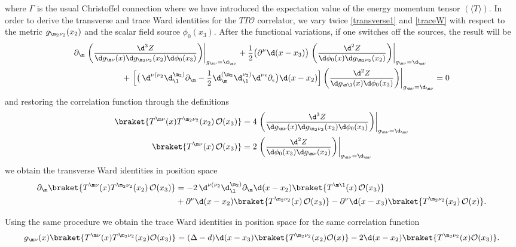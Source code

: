 \documentclass[a4paper,11pt,openright,twoside]{book}
\newcommand{\mO}{\mathcal{O}}
\let\e=\epsilon \let\z=\zeta   \let\h=\eta     \let\q=\theta
\let\n=\nu      \let\x=\xi     \let\p=\pi      \let\r=\rho
\let\G=\Gamma  \let\D=\Delta \let\Q=\Theta  \let\L=\Lambda
\newcommand{\sdfrac}[2]{\mbox{\small$\displaystyle\frac{#1}{#2}$}}
\numberwithin{equation}{section}
\begin{document}
{{where $\G$ is the usual Christoffel connection where we have introduced the  expectation value of the energy momentum tensor $(\langle T \rangle)$. In order to derive the transverse and trace Ward identities for the $TT\mO$ correlator, we vary twice \eqref{transverse1} and \eqref{traceW} with respect to the metric $g_{\m_2\n_2}(x_2)$ and the scalar field source $\phi_0(x_3)$. After the functional variations, if one switches off the sources, the result will be 
\begin{align}
	&\partial_\m\left.\left(\sdfrac{\d^3 Z}{\d g_{\m\n}(x)\d g_{\m_2\n_2}(x_2)\d\phi_0(x_3)}\right)\right|_{g_{\m\n}=\d_{\m\n}}+\sdfrac{1}{2}\big(\partial^\n\d(x-x_3)\big)\left.\left(\sdfrac{\d^2 Z}{\d \phi_0(x)\d g_{\m_2\n_2}(x_2)}\right)\right|_{g_{\m\n}=\d_{\m\n}}\notag\\
	&\hspace{2cm}+\left.\left[\big(\,\d^{\n(\n_2}\d^{\m_2)}_\l\partial_\m-\sdfrac{1}{2}\d_\m^{(\m_2}\d^{\n_2)}_\l\d^{\n\e}\partial_\e\big)\d(x-x_2)\right]\left(\sdfrac{\d^2 Z}{\d g_{\m\l}(x)\d\phi_0(x_3)}\right)\right|_{g_{\m\n}=\d_{\m\n}}=0
\end{align}
and restoring the correlation function through the definitions
\begin{align}
	\braket{T^{\m\n}(x)T^{\m_2\n_2}(x_2)\,\mO(x_3)}&=4\left.\left(\sdfrac{\d^3 Z}{\d g_{\m\n}(x)\d g_{\m_2\n_2}(x_2)\d\phi_0(x_3)}\right)\right|_{g_{\m\n}=\d_{\m\n}}\label{defTTO}\\
	\braket{T^{\m\n}(x)\,\mO(x_3)}&=2\left.\left(\sdfrac{\d^2 Z}{\d \phi_0(x_3)\d g_{\m\n}(x_2)}\right)\right|_{g_{\m\n}=\d_{\m\n}}
\end{align}
we obtain the transverse Ward identities in position space
\begin{align}
	\partial_\m\braket{T^{\m\n}(x)T^{\m_2\n_2}(x_2)\,\mO(x_3)}&=-2\,\d^{\n(\n_2}\d^{\m_2)}_\l\partial_\m\d(x-x_2)\braket{T^{\m\l}(x)\,\mO(x_3)}\notag\\
	&+\partial^\n\d(x-x_2)\braket{T^{\m_2\n_2}(x)\,\mO(x_3)}-\partial^\n\d(x-x_3)\braket{T^{\m_2\n_2}(x_2)\,\mO(x)}\label{transverse2}.
\end{align}

Using the same procedure we obtain the trace Ward identities in position space for the same correlation function
\begin{align}
	g_{\m\n}(x)\braket{T^{\m\n}(x)T^{\m_2\n_2}(x_2)\mO(x_3)}=(\D-d)\d(x-x_3)\braket{T^{\m_2\n_2}(x_2)\mO(x)}-2\d(x-x_2)\braket{T^{\m_2\n_2}(x)\mO(x_3)}.\label{trace2}
\end{align}

}}
\end{document}
